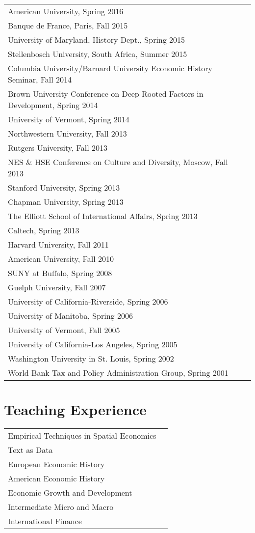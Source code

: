 \documentclass[11pt,fullpage]{article}
\begin{document}
\begin{tabular}{ll}
	American University, Spring 2016 \\
	Banque de France, Paris, Fall 2015 \\
	University of Maryland, History Dept., Spring 2015 \\
	Stellenbosch University, South Africa, Summer 2015 \\
	Columbia University/Barnard University Economic History Seminar, Fall 2014\\
	Brown University Conference on Deep Rooted Factors in Development, Spring 2014\\
	University of Vermont, Spring 2014\\
	Northwestern University, Fall 2013 \\
	Rutgers University, Fall 2013 \\
	NES \& HSE Conference on Culture and Diversity, Moscow, Fall 2013 \\
	Stanford University, Spring 2013 \\
	Chapman University, Spring 2013 \\
	The Elliott School of International Affairs, Spring 2013 \\
	Caltech, Spring 2013 \\
	Harvard University, Fall 2011 \\
	American University, Fall 2010 \\
	SUNY at Buffalo, Spring 2008 \\
	Guelph University, Fall 2007 \\
	University of California-Riverside, Spring 2006 \\
	University of Manitoba, Spring 2006 \\
	University of Vermont, Fall 2005 \\
	University of California-Los Angeles, Spring 2005 \\
	Washington University in St. Louis, Spring 2002 \\
	World Bank Tax and Policy Administration Group, Spring 2001 \\
\end{tabular}


\section*{Teaching Experience}

\begin{tabular}{ll}
	Empirical Techniques in Spatial Economics \\
	Text as Data \\
	European Economic History  \\
	American Economic History  \\ 
	Economic Growth and Development \\
	Intermediate Micro and Macro \\
	International Finance \\
\end{tabular}
\end{document}
